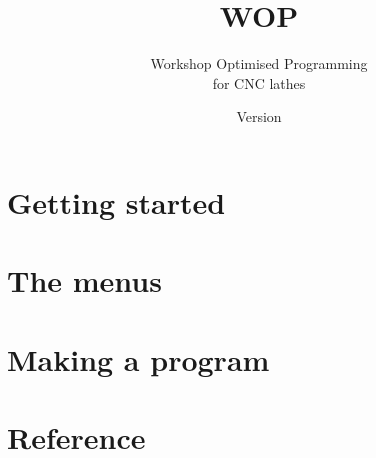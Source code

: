 \documentclass[a4paper,11pt,twoside,openany,parskip=half]{scrbook}
\begin{document}
\frontmatter
\titlehead{\centering\small Draft\\This manual is machine generated.}
\subject{User manual}
\title{WOP}
\subtitle{Workshop Optimised Programming\\for CNC lathes}
\author{}
\date{Version \wopversion\\\wopdate}
\maketitle


\tableofcontents

\mainmatter

\part{Getting started}




\part{The menus}






\part{Making a program}










\appendix
\part{Reference}




\end{document}
